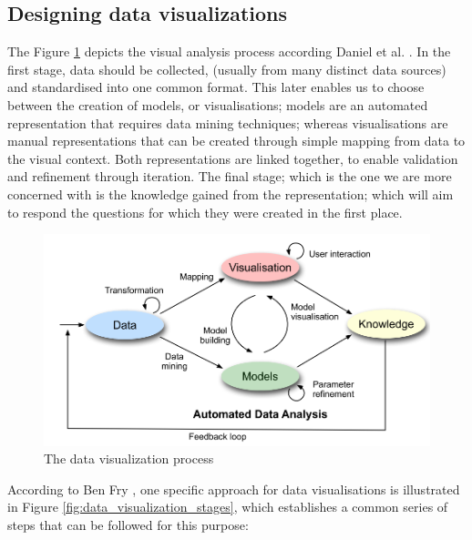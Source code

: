 \subsection{Designing data visualizations}
The Figure \ref{fig:data_visualization_process} depicts the visual analysis process according Daniel et al. \cite{KeimDaniel2010}. In the first stage,  data should be collected, (usually from many distinct data sources) and standardised into one common format. This later enables us to choose between the creation of models, or visualisations; models are an automated representation that requires data mining techniques; whereas visualisations are manual representations that can be created through simple mapping from data to the visual context. Both representations are linked together, to enable validation and refinement through iteration. The final stage; which is the one we are more concerned with is the knowledge gained from the representation; which will aim to respond the questions for which they were created in the first place.
\begin{figure}[!htb]
\begin{adjustbox}{width=1\textwidth,center=\textwidth}
  \centering
  \includegraphics[scale=1]{images/data_visualization_process.png}
\end{adjustbox}
  \caption[The data visualization process]{The data visualization process \cite{KeimDaniel2010} }
  \label{fig:data_visualization_process}
\end{figure}

According to Ben Fry \cite{Cleveland1993}, one specific approach for data visualisations is illustrated in Figure \ref{fig:data_visualization_stages}, which establishes a common series of steps that can be followed for this purpose:

